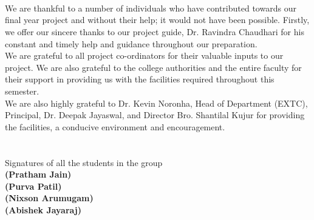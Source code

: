 \documentclass[12pt,singleside,a4paper]{report}
\begin{document}
\newpage
{}

\chapter*{}
\

We are thankful to a number of individuals who have contributed towards our final year
project and without their help; it would not have been possible. Firstly, we offer our
sincere thanks to our project guide, Dr. Ravindra Chaudhari for his constant and timely
help and guidance throughout our preparation.\\

We are grateful to all project co-ordinators for their valuable inputs to our project.
We are also grateful to the college authorities and the entire faculty for their support in
providing us with the facilities required throughout this semester.\\

We are also highly grateful to Dr. Kevin Noronha, Head of Department (EXTC),
Principal, Dr. Deepak Jayaswal, and Director Bro. Shantilal Kujur for providing the facilities, a conducive environment and encouragement.\\
\\
\\
\vspace{1.5cm}
\hspace{70.00mm}Signatures of all the students in the group\\
\vspace{1cm}
\hspace{90.00mm}\textbf{(Pratham Jain)}\\
\vspace{1cm}
\hspace{90.00mm}\textbf{(Purva Patil)}\\
\vspace{1cm}
\hspace{90.00mm}\textbf{(Nixson Arumugam)}\\
\vspace{1cm}
\hspace{90.00mm}\textbf{(Abishek Jayaraj)}





\pagestyle{plain} %
\end{document}
